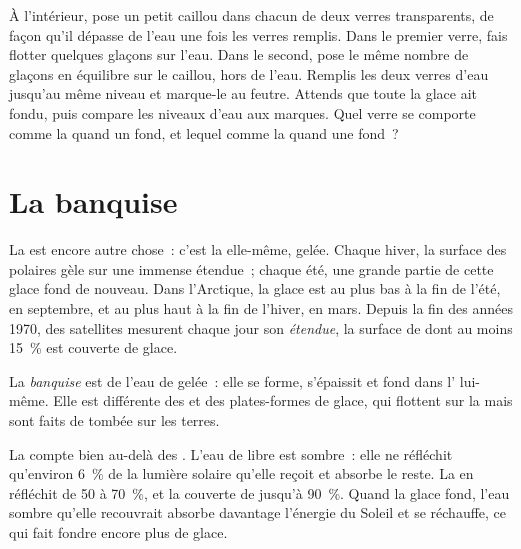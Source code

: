 \begin{inthelab}
À l'intérieur, pose un petit caillou dans chacun de deux verres
transparents, de façon qu'il dépasse de l'eau une fois les verres remplis.
Dans le premier verre, fais flotter quelques glaçons sur l'eau. Dans le
second, pose le même nombre de glaçons en équilibre sur le caillou, hors de
l'eau. Remplis les deux verres d'eau jusqu'au même niveau et marque-le au
feutre. Attends que toute la glace ait fondu, puis compare les niveaux
d'eau aux marques. Quel verre se comporte comme la  quand un 
fond, et lequel comme la  quand une  fond~?
\end{inthelab}

\section{La banquise}

La  est encore autre chose~: c'est la  elle-même, gelée. Chaque
hiver, la surface des  polaires gèle sur une immense étendue~;
chaque été, une grande partie de cette glace fond de nouveau. Dans
l'Arctique, la glace est au plus bas à la fin de l'été, en septembre, et
au plus haut à la fin de l'hiver, en mars. Depuis la fin des années 1970,
des satellites mesurent chaque jour son \emph{étendue}, la surface de 
dont au moins 15~\% est couverte de glace.

\begin{definition}[Banquise]\label{def:g8:ice-on-earth:sea-ice}
La \emph{banquise} est de l'eau de  gelée~: elle se forme, s'épaissit et fond
dans l' lui-même. Elle est différente des  et des plates-formes
de glace, qui flottent sur la  mais sont faits de  tombée sur les
terres.
\end{definition}

La  compte bien au-delà des . L'eau de  libre est
sombre~: elle ne réfléchit qu'environ 6~\% de la lumière solaire qu'elle
reçoit et absorbe le reste. La  en réfléchit de 50 à 70~\%, et la
 couverte de  jusqu'à 90~\%. Quand la glace fond, l'eau
sombre qu'elle recouvrait absorbe davantage l'énergie du Soleil et se
réchauffe, ce qui fait fondre encore plus de glace.

